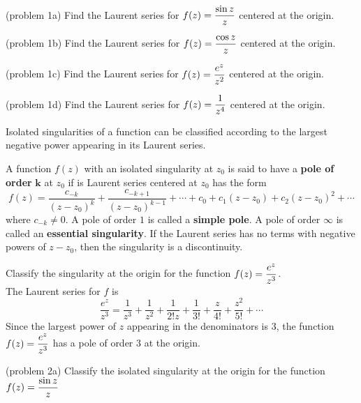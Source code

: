 \documentclass[handout]{ximera}
\begin{document}
\begin{problem}(problem 1a)
Find the Laurent series for $\displaystyle f(z) = \frac{\sin z}{z}$ centered at the origin.
\end{problem}

\begin{problem}(problem 1b)
Find the Laurent series for $\displaystyle f(z) = \frac{\cos z}{z}$ centered at the origin.
\end{problem}

\begin{problem}(problem 1c)
Find the Laurent series for $\displaystyle f(z) = \frac{e^z}{z^2}$ centered at the origin.
\end{problem}

\begin{problem}(problem 1d)
Find the Laurent series for $\displaystyle f(z) = \frac{1}{z^4}$ centered at the origin.
\end{problem}

Isolated singularities of a function can be classified according to the largest negative power appearing in
its Laurent series.

\begin{definition}
A function $f(z)$ with an isolated singularity at $z_0$ is said to have a \textbf{pole of order} $\boldsymbol{k}$ at $z_0$
if is Laurent series centered at $z_0$ has the form
\[
f(z) = \frac{c_{-k}}{(z-z_0)^k} +  \frac{c_{-k+1}}{(z-z_0)^{k-1}} + \cdots + c_0 + c_1(z-z_0) + c_2(z-z_0)^2 + \cdots
\]
where $c_{-k} \neq 0$.
A pole of order $1$ is called a {\bf simple pole}. A pole of order $\infty$ is called an {\bf essential singularity}.
If the Laurent series has no terms with negative powers of $z-z_0$, then the singularity is a discontinuity.
\end{definition}

\begin{example}[example 2]
Classify the singularity at the origin for the function $\displaystyle f(z) = \frac{e^z}{z^3}$.\\
The Laurent series for $f$ is
\[
\frac{e^z}{z^3} = \frac{1}{z^3} + \frac{1}{z^2} + \frac{1}{2!z} + \frac{1}{3!} + \frac{z}{4!} + \frac{z^2}{5!} + \cdots
\]
Since the largest power of $z$ appearing in the denominators is $3$, the function $\displaystyle f(z) = \frac{e^z}{z^3}$
has a pole of order $3$ at the origin.
\end{example}

\begin{problem}(problem 2a)
Classify the isolated singularity at the origin for the function $\displaystyle f(z) = \frac{\sin z}{z}$
\begin{multipleChoice}
\end{multipleChoice}
\end{problem}
\end{document}
